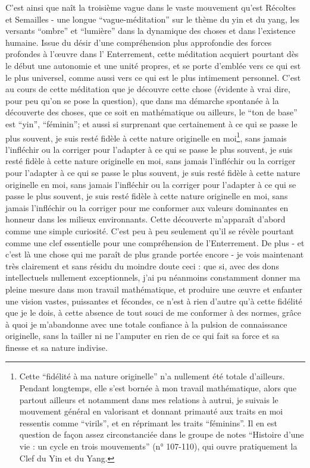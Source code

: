 C'est ainsi que naît la troisième vague dans le vaste mouvement qu'est Récoltes et Semailles - une longue ``vague-méditation'' sur le thème du yin et du yang, les versants ``ombre'' et ``lumière'' dans la dynamique des choses et dans l'existence humaine. Issue du désir d'une compréhension plus approfondie des forces profondes à l'œuvre dans l' Enterrement, cette méditation acquiert pourtant dès le début une autonomie et une unité propres, et se porte d'emblée vers ce qui est le plus universel, comme aussi vers ce qui est le plus intimement personnel. C'est au cours de cette méditation que je découvre cette chose (évidente à vrai dire, pour peu qu'on se pose la question), que dans ma démarche spontanée à la découverte des choses, que ce soit en mathématique ou ailleurs, le ``ton de base'' est ``yin'', ``féminin''; et aussi si surprenant que certainement à ce qui se passe le plus souvent, je suis resté fidèle à cette nature originelle en moi\footnote{Cette ``fidélité à ma nature originelle'' n'a nullement été totale d'ailleurs. Pendant longtemps, elle s'est bornée à mon travail mathématique, alors que partout ailleurs et notamment dans mes relations à autrui, je suivais le mouvement général en valorisant et donnant primauté aux traits en moi ressentis comme ``virils'', et en réprimant les traits ``féminins''. Il en est question de façon assez circonstanciée dans le groupe de notes ``Histoire d'une vie : un cycle en trois mouvements'' (n° 107-110), qui ouvre pratiquement la Clef du Yin et du Yang.}, sans jamais l'infléchir ou la corriger pour l'adapter à ce qui se passe le plus souvent, je suis resté fidèle à cette nature originelle en moi, sans jamais l'infléchir ou la corriger pour l'adapter à ce qui se passe le plus souvent, je suis resté fidèle à cette nature originelle en moi, sans jamais l'infléchir ou la corriger pour l'adapter à ce qui se passe le plus souvent, je suis resté fidèle à cette nature originelle en moi, sans jamais l'infléchir ou la corriger pour me conformer aux valeurs dominantes en honneur dans les milieux environnants. Cette découverte m'apparaît d'abord comme une simple curiosité. C'est peu à peu seulement qu'il se révèle pourtant comme une clef essentielle pour une compréhension de l'Enterrement. De plus - et c'est là une chose qui me paraît de plus grande portée encore - je vois maintenant très clairement et sans résidu du moindre doute ceci : que si, avec des dons intellectuels nullement exceptionnels, j'ai pu néanmoins constamment donner ma pleine mesure dans mon travail mathématique, et produire une œuvre et enfanter une vision vastes, puissantes et fécondes, ce n'est à rien d'autre qu'à cette fidélité que je le dois, à cette absence de tout souci de me conformer à des normes, grâce à quoi je m'abandonne avec une totale confiance à la pulsion de connaissance originelle, sans la tailler ni ne l'amputer en rien de ce qui fait sa force et sa finesse et sa nature indivise.

